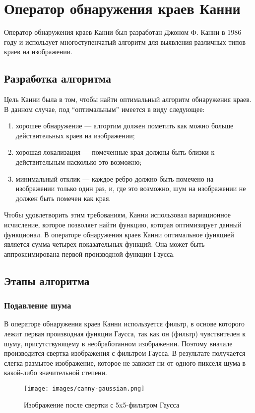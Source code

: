 \section{Оператор обнаружения краев Канни}
Оператор обнаружения краев Канни был разработан Джоном Ф. Канни в 1986 году и использует многоступенчатый алгоритм для выявления различных типов краев на изображении.

\subsection{Разработка алгоритма}
Цель Канни была в том, чтобы найти оптимальный алгоритм обнаружения краев. В данном случае, под ``оптимальным'' имеется в виду следующее:
\begin{enumerate}
  \item хорошее обнаружение --- алгортим должен пометить как можно больше действительных краев на изображении;
  \item хорошая локализация --- помеченные края должны быть близки к действительным насколько это возможно;
  \item минимальный отклик --- каждое ребро должно быть помечено на изображении только один раз, и, где это возможно, шум на изображении не должен быть помечен как края.
\end{enumerate}

Чтобы удовлетворить этим требованиям, Канни использовал вариационное исчисление, которое позволяет найти функцию, которая оптимизирует данный функционал. В операторе обнаружения краев Канни оптимальное функцией является сумма четырех показательных функций. Она может быть аппроксимирована первой производной функции Гаусса.

\subsection{Этапы алгоритма}
\subsubsection{Подавление шума}
В операторе обнаружения краев Канни используется фильтр, в основе которого лежит первая производная функции Гаусса, так как он (фильтр) чувствителен к шуму, присутствующему в необработанном изображении. Поэтому вначале производится свертка изображения с фильтром Гаусса. В результате получается слегка размытое изображение, которое не зависит ни от одного пикселя шума в какой-либо значительной степени.

\begin{figure}
  \centering
  \texttt{[image: images/canny-gaussian.png]}
  \caption{Изображение после свертки с 5x5-фильтром Гаусса\label{canny-gaussian}}
\end{figure}

